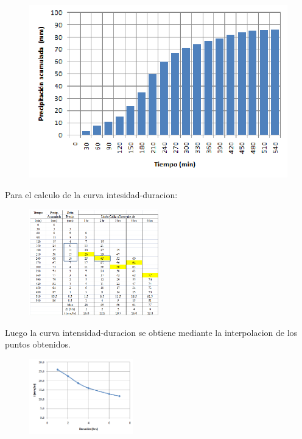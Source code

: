\begin{figure}[!htbp]
\begin{minipage}{0.15\textwidth}
        \label{datos_i_d}
    \end{minipage}
    \hspace{0.05\textwidth} %
    \begin{minipage}{0.3\textwidth}
        \centering
        \includegraphics[width=\textwidth]{imagenes/histograma_i_d.png}
        \label{histograma_i_d}
    \end{minipage}
\end{figure}

Para el calculo de la curva intesidad-duracion:

\begin{figure}[H]
    \centering
    \includegraphics[width=0.5\textwidth]{imagenes/calculo_i_d.png}
    \label{calculo_i_d}
\end{figure}

Luego la curva intensidad-duracion se obtiene mediante la interpolacion de los puntos obtenidos.\\

\begin{figure}[H]
    \centering
    \includegraphics[width=0.4\textwidth]{imagenes/curva_i_d.png}
    \label{curva_i_d}
\end{figure}

